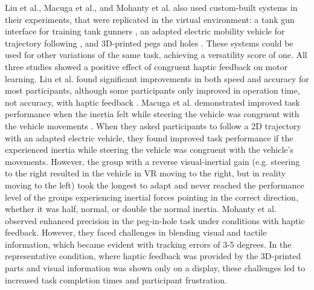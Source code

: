 Liu et al., Macuga et al., and Mohanty et al. also used custom-built systems in their experiments, that were replicated in the virtual environment: a tank gun interface for training tank gunners \cite{LiuG2014}, an adapted electric mobility vehicle for trajectory following \cite{Macuga2019}, and 3D-printed pegs and holes \cite{Mohanty2023}. These systems could be used for other variations of the same task, achieving a versatility score of one. All three studies showed a positive effect of congruent haptic feedback on motor learning. 
Liu et al. found significant improvements in both speed and accuracy for most participants, although some participants only improved in operation time, not accuracy, with haptic feedback \cite{LiuG2014}. Macuga et al. demonstrated improved task performance when the inertia felt while steering the vehicle was congruent with the vehicle movements \cite{Macuga2019}. When they asked participants to follow a 2D trajectory with an adapted electric vehicle, they found improved task performance if the experienced inertia while steering the vehicle was congruent with the vehicle's movements. However, the group with a reverse visual-inertial gain (e.g. steering to the right resulted in the vehicle in VR moving to the right, but in reality moving to the left) took the longest to adapt and never reached the performance level of the groups experiencing inertial forces pointing in the correct direction, whether it was half, normal, or double the normal inertia. 
Mohanty et al. observed enhanced precision in the peg-in-hole task under conditions with haptic feedback. However, they faced challenges in blending visual and tactile information, which became evident with tracking errors of 3-5 degrees. In the representative condition, where haptic feedback was provided by the 3D-printed parts and visual information was shown only on a display, these challenges led to increased task completion times and participant frustration.

